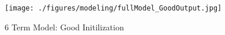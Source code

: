 \begin{figure}[ht!]
\texttt{[image: ./figures/modeling/fullModel\_GoodOutput.jpg]}
\centering
\caption{6 Term Model: Good Initilization}
\label{fig:fullModel_GoodOutput}
\end{figure}
